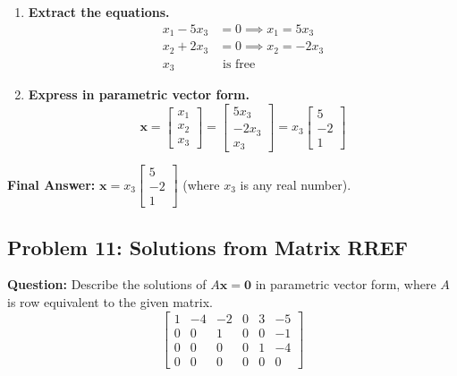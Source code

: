 \documentclass[11pt]{article}
\begin{document}
\begin{enumerate}
\begin{itemize}
\[        \left[ \begin{array}{ccc|c}
        1 & 0 & -5 & 0 \\
        0 & 1 & 2 & 0 \\
        0 & 0 & 0 & 0
        \end{array} \right]
        \]
    \end{itemize}
    \item \textbf{Extract the equations.} 
    \begin{align*}
        x_1 - 5x_3 &= 0 \implies x_1 = 5x_3 \\
        x_2 + 2x_3 &= 0 \implies x_2 = -2x_3 \\
        x_3 &\text{ is free}
    \end{align*}
    \item \textbf{Express in parametric vector form.}
    \[
    \mathbf{x} = \begin{bmatrix} x_1 \\ x_2 \\ x_3 \end{bmatrix} = \begin{bmatrix} 5x_3 \\ -2x_3 \\ x_3 \end{bmatrix} = x_3 \begin{bmatrix} 5 \\ -2 \\ 1 \end{bmatrix}
    \]
\end{enumerate}
\textbf{Final Answer:} $\mathbf{x} = x_3 \begin{bmatrix} 5 \\ -2 \\ 1 \end{bmatrix}$ (where $x_3$ is any real number).

\subsection*{Problem 11: Solutions from Matrix RREF}
\textbf{Question:} Describe the solutions of $A\mathbf{x} = \mathbf{0}$ in parametric vector form, where $A$ is row equivalent to the given matrix.
\[
\begin{bmatrix}
1 & -4 & -2 & 0 & 3 & -5 \\
0 & 0 & 1 & 0 & 0 & -1 \\
0 & 0 & 0 & 0 & 1 & -4 \\
0 & 0 & 0 & 0 & 0 & 0
\end{bmatrix}
\]
\end{document}
